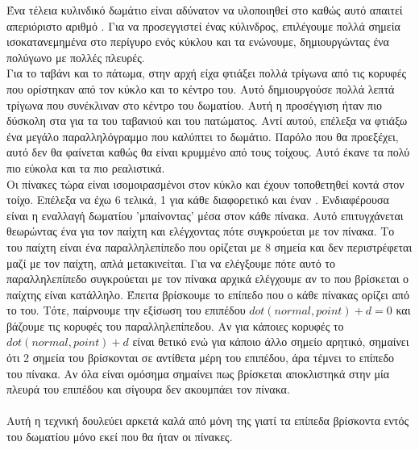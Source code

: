 \documentclass[11pt]{scrartcl} %
\begin{document}
Ένα τέλεια κυλινδικό δωμάτιο είναι αδύνατον να υλοποιηθεί στο  καθώς αυτό απαιτεί απεριόριστο αριθμό .
Για να προσεγγιστεί ένας κύλινδρος, επιλέγουμε πολλά σημεία ισοκατανεμημένα στο περίγυρο ενός κύκλου και τα ενώνουμε, δημιουργώντας ένα πολύγωνο
με πολλές πλευρές. 
\\
Για το ταβάνι και το πάτωμα, στην αρχή είχα φτιάξει πολλά τρίγωνα από τις κορυφές που ορίστηκαν από τον κύκλο και το κέντρο του.
Αυτό δημιουργούσε πολλά λεπτά τρίγωνα που συνέκλιναν στο κέντρο του δωματίου. Αυτή η προσέγγιση ήταν πιο δύσκολη στα  για
τα  του ταβανιού και του πατώματος. Αντί αυτού, επέλεξα να φτιάξω ένα μεγάλο παραλληλόγραμμο που καλύπτει το δωμάτιο.
Παρόλο που θα προεξέχει, αυτό δεν θα φαίνεται καθώς θα είναι κρυμμένο από τους τοίχους. Αυτό έκανε τα  πολύ πιο εύκολα και
τα  πιο ρεαλιστικά.
\\
Οι πίνακες τώρα είναι ισομοιρασμένοι στον κύκλο και έχουν τοποθετηθεί κοντά στον τοίχο. Επέλεξα να έχω 6 τελικά, 1 για κάθε
διαφορετικό  και έναν . Ενδιαφέρουσα είναι η εναλλαγή δωματίου 'μπαίνοντας' μέσα στον κάθε πίνακα.
Αυτό επιτυγχάνεται θεωρώντας ένα  για τον παίχτη και ελέγχοντας πότε συγκρούεται με τον πίνακα.
Το  του παίχτη είναι ένα παραλληλεπίπεδο που ορίζεται με 8 σημεία και δεν περιστρέφεται μαζί με τον παίχτη, απλά
μετακινείται. Για να ελέγξουμε πότε αυτό το παραλληλεπίπεδο συγκρούεται με τον πίνακα αρχικά ελέγχουμε αν το  που βρίσκεται
ο παίχτης είναι κατάλληλο. Έπειτα βρίσκουμε το επίπεδο που ο κάθε πίνακας ορίζει από
το  του. Τότε, παίρνουμε την εξίσωση του επιπέδου $ dot(normal, point) + d = 0 $ και βάζουμε τις κορυφές του 
παραλληλεπίπεδου. Αν για κάποιες κορυφές το $ dot(normal, point) + d $ είναι θετικό ενώ για κάποιο άλλο σημείο αρητικό, σημαίνει
ότι 2 σημεία του  βρίσκονται σε αντίθετα μέρη του επιπέδου, άρα τέμνει το επίπεδο του πίνακα. Αν όλα είναι ομόσημα
σημαίνει πως βρίσκεται αποκλιστηκά στην μία πλευρά του επιπέδου και σίγουρα δεν ακουμπάει τον πίνακα.
\\\\
Αυτή η τεχνική δουλεύει αρκετά καλά από μόνη της γιατί τα επίπεδα βρίσκοντα εντός του δωματίου μόνο εκεί που θα ήταν οι πίνακες.
\end{document}
